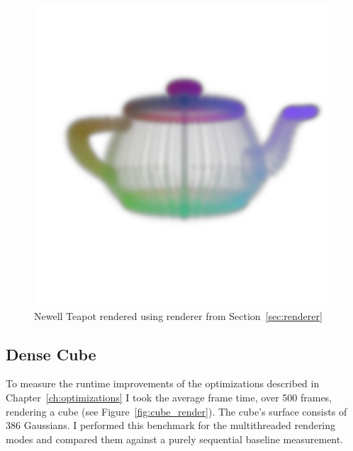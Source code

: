 \documentclass[a4paper, 11pt]{memoir}
\begin{document}
    \begin{figure}[t]
        \centering
        \includegraphics[scale=.2]{images/teapot.png}
        \caption{Newell Teapot rendered using renderer from Section~\ref{sec:renderer}}
        \label{fig:teapot_render}
    \end{figure}
    
    \subsection{Dense Cube}
    \label{sec:dense_cube}
    To measure the runtime improvements of the optimizations described in Chapter~\ref{ch:optimizations} I took the average
    frame time, over 500 frames, rendering a cube (see Figure~\ref{fig:cube_render}). The cube's surface consists of
    386 Gaussians. I performed this benchmark for the multithreaded rendering modes and compared them against a purely
    sequential baseline measurement.
\end{document}
